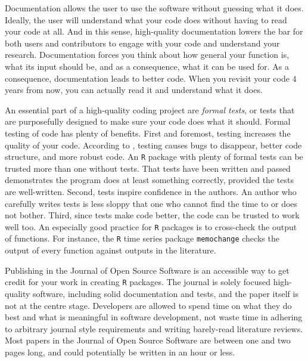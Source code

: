 Documentation allows the user to use the software without guessing what it does. Ideally, the user will understand what your code does without having to read your code at all. And in this sense, high-quality documentation lowers the bar for both users and contributors to engage with your code and understand your research. Documentation forces you think about how general your function is, what its input should be, and as a consequence, what it can be used for. As a consequence, documentation leads to better code. When you revisit your code $4$ years from now, you can actually read it and understand what it does. 

An essential part of a high-quality coding project are \emph{formal tests}, or tests that are purposefully designed to make sure your code does what it should. Formal testing of code has plenty of benefits. First and foremost, testing increases the quality of your code. According to \textcite[Chapter 7]{Wickham2015-ik}, testing causes bugs to disappear, better code structure, and more robust code. An \texttt{R} package with plenty of formal tests can be trusted more than one without tests. That tests have been written and passed demonstrates the program does at least something correctly, provided the tests are well-written. Second, tests inspire confidence in the authors. An author who carefully writes tests is less sloppy that one who cannot find the time to or does not bother. Third, since tests make code better, the code can be trusted to work well too. An especially good practice for \texttt{R} packages is to cross-check the output of functions. For instance, the \texttt{R} time series package \texttt{memochange} \parencite{memochange} checks the output of every function against outputs in the literature.

Publishing in the Journal of Open Source Software is an accessible way to get credit for your work in creating \texttt{R} packages. The journal is solely focused high-quality software, including solid documentation and tests, and the paper itself is not at the centre stage. Developers are allowed to spend time on what they do best and what is meaningful in software development, not waste time in adhering to arbitrary journal style requirements and writing barely-read literature reviews. Most papers in the Journal of Open Source Software are between one and two pages long, and could potentially be written in an hour or less. 